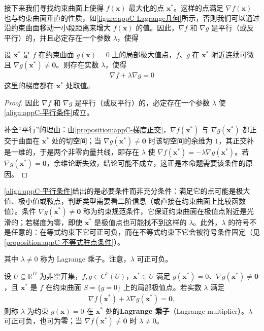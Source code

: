 \documentclass[../main.tex]{subfiles}
\begin{document}
接下来我们寻找约束曲面上使得 $f(\bm{x})$ 最大化的点 $\bm{x}^{*}$。这样的点满足 $\nabla f(\bm{x})$ 也与约束曲面垂直的性质，如\cref{figure:appC-Lagrange几何}所示，否则我们可以通过沿约束曲面移动一小段距离来增大 $f(\bm{x})$ 的值。因此，$\nabla f$ 和 $\nabla g$ 是平行（或反平行）的，并且必定存在一个参数 $\lambda$，使得
\begin{proposition}[约束极值点的必要条件]\label{proposition:appC-约束驻点}
设 $\bm{x}^{*}$ 是 $f$ 在约束曲面 $g(\bm{x})=0$ 上的局部极大值点，$f$、$g$ 在 $\bm{x}^{*}$ 附近连续可微且 $\nabla g(\bm{x}^{*})\neq\bm{0}$。则存在实数 $\lambda$，使得
\begin{align}
  \nabla f+\lambda\nabla g=0
  \label{align:appC-平行条件}
\end{align}
这里的梯度都在 $\bm{x}^{*}$ 处取值。
\end{proposition}

\begin{proof}
因此 $\nabla f$ 和 $\nabla g$ 是平行（或反平行）的，必定存在一个参数 $\lambda$ 使\eqref{align:appC-平行条件}成立。

补全“平行”的理由：由\cref{proposition:appC-梯度正交}，$\nabla f(\bm{x}^{*})$ 与 $\nabla g(\bm{x}^{*})$ 都正交于曲面在 $\bm{x}^{*}$ 处的切空间；当 $\nabla g(\bm{x}^{*})\neq\bm{0}$ 时该切空间的余维为 $1$，其正交补是一维的，于是两个非零向量共线，即存在 $\lambda$ 使 $\nabla f(\bm{x}^{*})=-\lambda\nabla g(\bm{x}^{*})$。若 $\nabla g(\bm{x}^{*})=\bm{0}$，余维论断失效，结论可能不成立，这正是本命题需要该条件的原因。
\end{proof}

\begin{remark}
\eqref{align:appC-平行条件}给出的是必要条件而非充分条件：满足它的点可能是极大值、极小值或鞍点，判断类型需要看二阶信息（或直接在约束曲面上比较函数值）。条件 $\nabla g(\bm{x}^{*})\neq\bm{0}$ 称为约束规范条件，它保证约束曲面在极值点附近是光滑的；若梯度为零，即使 $\bm{x}^{*}$ 是极值点也可能找不到这样的 $\lambda$。此外，$\lambda$ 的符号不是任意的：在等式约束下它可正可负，而在不等式约束下它会被符号条件固定（见\cref{proposition:appC-不等式驻点条件}）。
\end{remark}

其中 $\lambda\neq0$ 称为 Lagrange 乘子。注意，$\lambda$ 可正可负。

\begin{definition}[Lagrange 乘子]\label{definition:appC-乘子}
设 $U\subseteq\mathbb{R}^{D}$ 为非空开集，$f,g\in C^{1}(U)$，$\bm{x}^{*}\in U$ 满足 $g(\bm{x}^{*})=0$、$\nabla g(\bm{x}^{*})\neq\bm{0}$，且 $\bm{x}^{*}$ 是 $f$ 在约束曲面 $S=\{g=0\}$ 上的局部极值点。若实数 $\lambda$ 满足
\begin{align*}
  \nabla f(\bm{x}^{*})+\lambda\nabla g(\bm{x}^{*})=\bm{0},
\end{align*}
则称 $\lambda$ 为约束 $g(\bm{x})=0$ 在 $\bm{x}^{*}$ 处的\textbf{Lagrange 乘子}（Lagrange multiplier）。$\lambda$ 可正可负，也可为零；当 $\nabla f(\bm{x}^{*})\neq\bm{0}$ 时 $\lambda\neq0$。
\end{definition}
\end{document}

